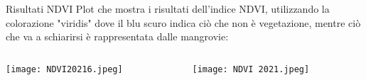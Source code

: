 \documentclass{beamer} %
\begin{document}
        \begin{frame}{Risultati NDVI}
Plot che mostra i risultati dell'indice NDVI, utilizzando la colorazione "viridis" dove il blu scuro indica ciò che non è vegetazione, mentre ciò che va a schiarirsi è rappresentata dalle mangrovie:
\bigskip
\begin{columns}
    \begin{column}{0.6\textwidth}
    \begin{center}
        \texttt{[image: NDVI20216.jpeg]}
        \caption{NDVI 2016}
        \end{center}
\end{column}
\begin{column}{0.6\textwidth}
\begin{center}
\texttt{[image: NDVI 2021.jpeg]}
\caption{NDVI 2021}
\end{center}
\end{column}
\end{columns}
     \end{frame}
\end{document}
